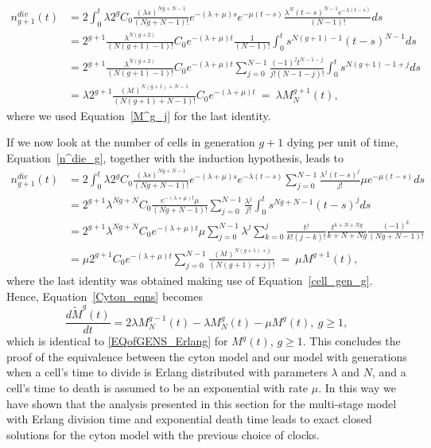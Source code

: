 \documentclass[10pt]{article}
\numberwithin{equation}{section}
\begin{document}
\begin{align*}
    n^{div}_{g+1}(t) & = 2 \int_0^t \lambda 2^g C_0 
    \frac{(\lambda s)^{Ng + N -1}}{(Ng + N -1)!} e^{-(\lambda + \mu)s} e^{-\mu(t-s)} 
    \frac{\lambda^N (t-s)^{N-1} e^{-\lambda(t-s)}}{(N -1)!} ds \\
    & = 2^{g+1} \frac{\lambda^{N(g+2)}}{(N(g+1)-1)!} C_0 e^{-(\lambda + \mu)t} \frac{1}{(N-1)!} \int_0^t s^{N(g+1)-1} (t-s)^{N-1} ds \\
    & = 2^{g+1} \frac{\lambda^{N(g+2)}}{(N(g+1)-1)!} C_0 e^{-(\lambda + \mu)t}
    \sum_{j=0}^{N-1} \frac{(-1)^j t^{N-1-j}}{j! (N-1-j)!} 
    \int_0^t s^{N(g+1)-1+j}ds \\
    & = \lambda 2^{g+1} \frac{(\lambda t)^{N(g+1)+N-1}}{(N(g+1)+N-1)!} C_0 e^{-(\lambda + \mu)t} \ =\ \lambda M^{g+1}_N(t),
\end{align*}
where we used Equation~\eqref{M^g_j} for the last identity.

If we now look at the
 number of cells in generation $g+1$ dying per unit of time, Equation~\eqref{n^die_g}, together with the induction hypothesis, leads to
\begin{align*}
    n^{die}_{g+1}(t) & = 2 \int_0^t \lambda 2^g C_0 
    \frac{(\lambda s)^{Ng + N -1}}{(Ng + N -1)!} e^{-(\lambda + \mu)s} e^{-\lambda(t-s)} 
    \sum_{j=0}^{N-1} \frac{\lambda^j (t-s)^j}{j!}
    \mu e^{-\mu(t-s)} ds \\
    & = 2^{g+1} \lambda^{Ng + N} C_0 \frac{e^{-(\lambda + \mu)t} \mu}{(Ng + N -1)!} 
    \sum_{j=0}^{N-1} \frac{\lambda^j}{j!} \int_0^t s^{Ng + N - 1} (t-s)^j ds \\
    & = 2^{g+1} \lambda^{Ng + N} C_0 e^{-(\lambda + \mu)t} \mu 
    \sum_{j=0}^{N-1} \lambda^j 
    \sum_{k=0}^j \frac{t^j}{k!(j-k)!} \frac{t^{k+N+Ng}}{k+N+Ng} 
    \frac{(-1)^k}{(Ng+N-1)!} \\
    & = \mu 2^{g+1} C_0 e^{-(\lambda + \mu)t} \sum_{j=0}^{N-1} \frac{(\lambda t)^{N(g+1)+j}}{(N(g+1)+j)!} \ = \ \mu M^{g+1}(t),
\end{align*}
where the last identity was obtained making
use of Equation~\eqref{cell_gen_g}.
Hence, Equation~\eqref{Cyton_eqns} becomes
\begin{equation*}
    \frac{d{\widetilde M}^g(t)}{dt} = 2 \lambda M^{g-1}_N(t) - \lambda M^g_N(t) - \mu M^g(t), \ g \ge 1,
\end{equation*}
which is identical to \eqref{EQofGENS_Erlang} for $M^g(t)$, $g \ge 1$.
This concludes the proof of  the equivalence between the cyton model and our model with generations when a cell's time to divide is Erlang distributed with parameters $\lambda$ and $N$, and a cell's time to death is assumed to be an exponential with rate $\mu$. 
In this way we have shown that the analysis presented in this section
for  the multi-stage model with Erlang division time and exponential death time
leads to exact closed solutions for the cyton model
with the previous choice of clocks.
\end{document}

